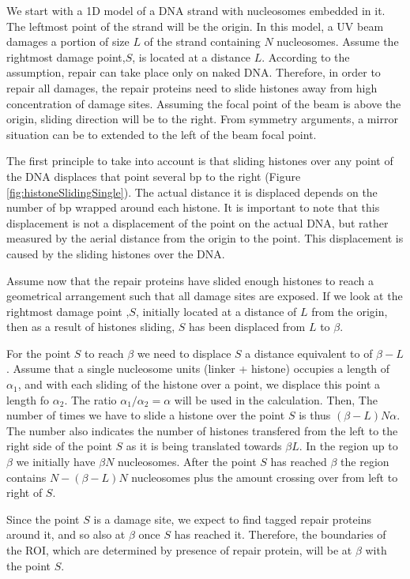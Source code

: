 \documentclass[12pt]{report}
\begin{document}
   We start with a 1D model of a DNA strand with nucleosomes embedded in it. The leftmost point of the strand will be the origin. In this model, a UV beam damages a portion of size $L$ of the strand containing $N$ nucleosomes. Assume the rightmost damage point,$S$, is located at a distance $L$. According to the assumption, repair can take place only on naked DNA. Therefore, in order to repair all damages, the repair proteins need to slide histones away from high concentration of damage sites. Assuming the focal point of the beam is above the origin, sliding direction will be to the right. From symmetry arguments, a mirror situation can be to extended to the left of the beam focal point.     
   
   The first principle to take into account is that sliding histones over any point of the DNA displaces that point several bp to the right (Figure \ref{fig:histoneSlidingSingle}). The actual distance it is displaced depends on the number of bp wrapped around each histone. It is important to note that this displacement is not a displacement of the point on the actual DNA, but rather measured by the aerial distance from the origin to the point. This displacement is caused by the sliding histones over the DNA.
   
   Assume now that the repair proteins have slided enough histones to reach a geometrical arrangement such that all damage sites are exposed. If we look at the rightmost damage point ,$S$, initially located at a distance of $L$ from the origin, then as a result of histones sliding, $S$ has been displaced from $L$ to $\beta$. 
   
   For the point $S$ to reach $\beta$ we need to displace $S$ a distance equivalent to of $\beta-L$. Assume that a single nucleosome units (linker + histone) occupies a length of $\alpha_1$, and with each sliding of the histone over a point, we displace this point a length fo $\alpha_2$. The ratio $\alpha_1/\alpha_2 =\alpha$ will be used in the calculation. Then, The number of times we have to slide a histone over the point $S$ is thus $(\beta-L)N\alpha$.
   The number also indicates the number of histones transfered from the left to the right side of the point $S$ as it is being translated towards $\beta L$.
   In the region up to $\beta$ we initially have $\beta N$ nucleosomes. After the point $S$ has reached $\beta$ the region contains $N-(\beta-L)N$ nucleosomes plus the amount crossing over from left to right of $S$. 
   
   Since the point $S$ is a damage site, we expect to find tagged repair proteins around it, and so also at $\beta$ once $S$ has reached it. Therefore, the  boundaries of the ROI, which are determined by presence of repair protein, will be at $\beta$ with the point $S$. 
   
\end{document}
